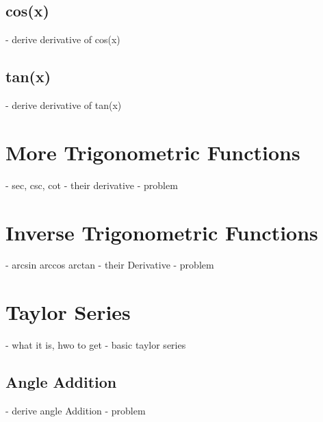 \subsection{cos(x)}
- derive derivative of cos(x)
\subsection{tan(x)}
- derive derivative of tan(x)
\section{More Trigonometric Functions}
- sec, csc, cot
- their derivative 
- problem
\section{Inverse Trigonometric Functions}
- arcsin arccos arctan
- their Derivative
- problem
\section{Taylor Series}
- what it is, hwo to get
- basic taylor series 

\begin{subappendices}
    \section{Angle Addition}
    - derive angle Addition
    - problem
\end{subappendices}